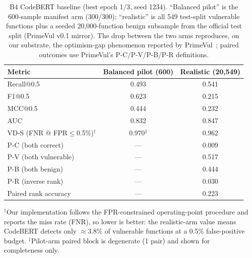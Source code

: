 \begin{table}[t]
\centering
\caption{B4 CodeBERT baseline (best epoch 1/3, seed 1234). ``Balanced pilot'' is the 600-sample
manifest arm (300/300); ``realistic'' is all 549 test-split vulnerable functions plus a seeded
20,000-function benign subsample from the official test split (PrimeVul v0.1 mirror). The drop
between the two arms reproduces, on our substrate, the optimism-gap phenomenon reported by
PrimeVul~\cite{ding2025primevul}; paired outcomes use PrimeVul's P-C/P-V/P-B/P-R definitions.}
\label{tab:codebert}
\small
\begin{tabular}{@{}lcc@{}}
\toprule
Metric & Balanced pilot (600) & Realistic (20{,}549) \\
\midrule
Recall@0.5 & 0.493 & 0.541 \\
F1@0.5     & 0.623 & 0.215 \\
MCC@0.5    & 0.444 & 0.232 \\
AUC        & 0.832 & 0.847 \\
\midrule
VD-S (FNR @ FPR$\leq$0.5\%)$^{\dagger}$ & 0.970$^{\ddagger}$ & 0.962 \\
\midrule
P-C (both correct)   & --- & 0.009 \\
P-V (both vulnerable)& --- & 0.517 \\
P-B (both benign)    & --- & 0.444 \\
P-R (inverse rank)   & --- & 0.030 \\
Paired rank accuracy & --- & 0.223 \\
\bottomrule
\end{tabular}

\vspace{2pt}
\raggedright\footnotesize
$^{\dagger}$Our implementation follows the FPR-constrained operating-point procedure and
reports the miss rate (FNR), so lower is better: the realistic-arm value means CodeBERT detects
only $\approx$3.8\% of vulnerable functions at a 0.5\% false-positive budget.
$^{\ddagger}$Pilot-arm paired block is degenerate (1 pair) and shown for completeness only.
\end{table}
